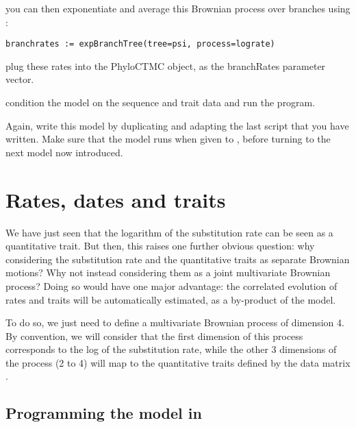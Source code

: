 you can then exponentiate and average this Brownian process over branches using :
{\tt \small \begin{snugshade*}
\begin{lstlisting}
branchrates := expBranchTree(tree=psi, process=lograte)
\end{lstlisting}
\end{snugshade*}}

plug these rates into the PhyloCTMC object, as the branchRates parameter vector.

condition the model on the sequence and trait data and run the program.

Again, write this model by duplicating and adapting the last script that you have written. Make sure that the model runs when given to \RevBayes, before turning to the next model now introduced.

\section{Rates, dates and traits}

We have just seen that the logarithm of the substitution rate can be seen as a quantitative trait. But then, this raises one further obvious question: why considering the substitution rate and the quantitative traits as separate Brownian motions? Why not instead considering them as a joint multivariate Brownian process? Doing so would have one major advantage: the correlated evolution of rates and traits will be automatically estimated, as a by-product of the model.

To do so, we just need to define a multivariate Brownian process of dimension 4.
By convention, we will consider that the first dimension of this process
corresponds to the log of the substitution rate,
while the other 3 dimensions of the process (2 to 4) will map to the quantitative traits defined by the data matrix
\citep{Lartillot2011}.

\subsection{Programming the model in \RevBayes}

